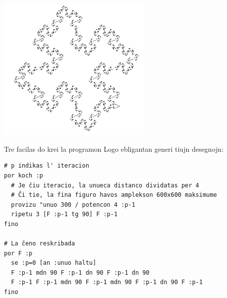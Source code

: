 \begin{center}
\begin{minipage}{7.5cm}
\end{minipage}
\begin{minipage}{7.5cm}
 \includegraphics[width=7.5cm]{bildoj/linden-koch4.png}
\end{minipage}
\end{center}
Tre facilas do krei la programon Logo ebligantan generi tiujn desegnojn:
\begin{verbatim}
# p indikas l' iteracion
por koch :p
  # Je ĉiu iteracio, la unueca distanco dividatas per 4
  # Ĉi tie, la fina figuro havos amplekson 600x600 maksimume
  provizu "unuo 300 / potencon 4 :p-1
  ripetu 3 [F :p-1 tg 90] F :p-1 
fino

# La ĉeno reskribada
por F :p
  se :p=0 [an :unuo haltu]
  F :p-1 mdn 90 F :p-1 dn 90 F :p-1 dn 90
  F :p-1 F :p-1 mdn 90 F :p-1 mdn 90 F :p-1 dn 90 F :p-1
fino
\end{verbatim}

